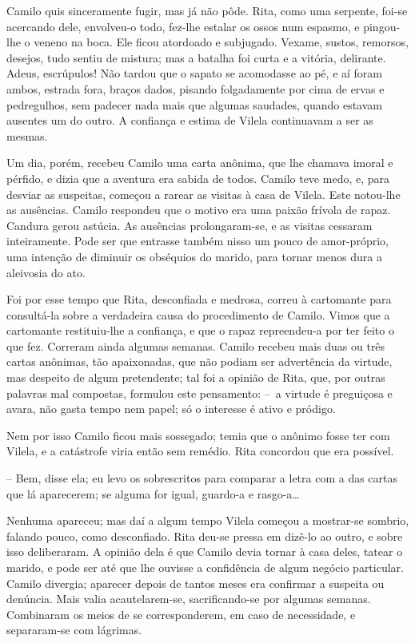 Camilo quis sinceramente fugir, mas já não pôde. Rita, como uma
serpente, foi-se acercando dele, envolveu-o todo, fez-lhe estalar os
ossos num espasmo, e pingou-lhe o veneno na boca. Ele ficou atordoado e
subjugado. Vexame, sustos, remorsos, desejos, tudo sentiu de mistura;
mas a batalha foi curta e a vitória, delirante. Adeus, escrúpulos! Não
tardou que o sapato se acomodasse ao pé, e aí foram ambos, estrada fora,
braços dados, pisando folgadamente por cima de ervas e pedregulhos, sem
padecer nada mais que algumas saudades, quando estavam ausentes um do
outro. A confiança e estima de Vilela continuavam a ser as mesmas.

Um dia, porém, recebeu Camilo uma carta anônima, que lhe chamava imoral
e pérfido, e dizia que a aventura era sabida de todos. Camilo teve medo,
e, para desviar as suspeitas, começou a rarear as visitas à casa de
Vilela. Este notou-lhe as ausências. Camilo respondeu que o motivo era
uma paixão frívola de rapaz. Candura gerou astúcia. As ausências
prolongaram-se, e as visitas cessaram inteiramente. Pode ser que
entrasse também nisso um pouco de amor-próprio, uma intenção de diminuir
os obséquios do marido, para tornar menos dura a aleivosia do ato.

Foi por esse tempo que Rita, desconfiada e medrosa, correu à cartomante
para consultá-la sobre a verdadeira causa do procedimento de Camilo.
Vimos que a cartomante restituiu-lhe a confiança, e que o rapaz
repreendeu-a por ter feito o que fez. Correram ainda algumas semanas.
Camilo recebeu mais duas ou três cartas anônimas, tão apaixonadas, que
não podiam ser advertência da virtude, mas despeito de algum
pretendente; tal foi a opinião de Rita, que, por outras palavras mal
compostas, formulou este pensamento: --~a virtude é preguiçosa e avara,
não gasta tempo nem papel; só o interesse é ativo e pródigo.

Nem por isso Camilo ficou mais sossegado; temia que o anônimo fosse ter
com Vilela, e a catástrofe viria então sem remédio. Rita concordou que
era possível.

-- Bem, disse ela; eu levo os sobrescritos para comparar a letra com a
das cartas que lá aparecerem; se alguma for igual, guardo-a e
rasgo-a\ldots{}

Nenhuma apareceu; mas daí a algum tempo Vilela começou a mostrar-se
sombrio, falando pouco, como desconfiado. Rita deu-se pressa em dizê-lo
ao outro, e sobre isso deliberaram. A opinião dela é que Camilo devia
tornar à casa deles, tatear o marido, e pode ser até que lhe ouvisse a
confidência de algum negócio particular. Camilo divergia; aparecer
depois de tantos meses era confirmar a suspeita ou denúncia. Mais valia
acautelarem-se, sacrificando-se por algumas semanas. Combinaram os meios
de se corresponderem, em caso de necessidade, e separaram-se com
lágrimas.

